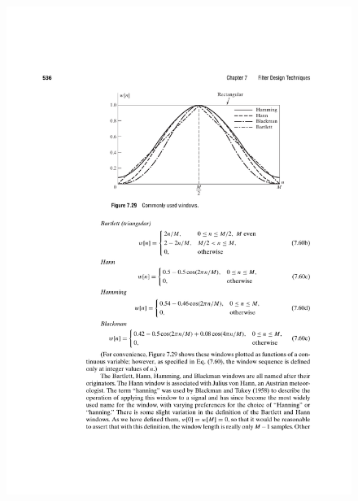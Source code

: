 \documentclass[11pt]{article}
\begin{document}
\begin{figure}[H]
	\centering
	\begin{minipage}{.5\textwidth}
	  \centering
	  \includegraphics[width=1\linewidth]{windows}
	  \label{fig:test1}
	\end{minipage}%
	\begin{minipage}{.5\textwidth}
	  \centering

\end{minipage}
\end{figure}
\end{document}
